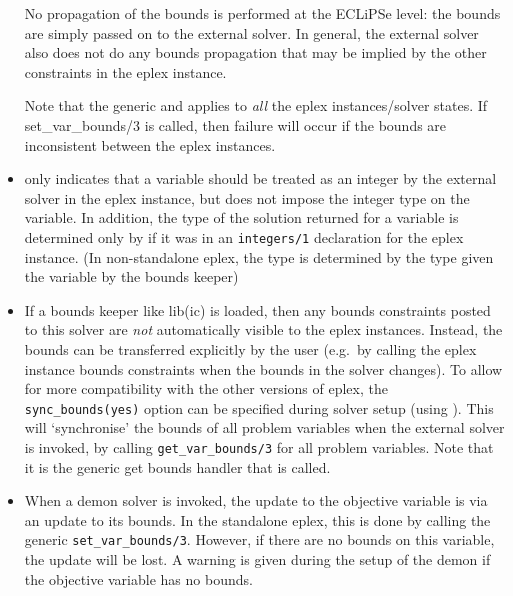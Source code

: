 \begin{sloppypar}
\begin{itemize}
No propagation of the bounds is performed at the ECLiPSe level: the bounds
are simply passed on to the external solver. In general, the external
solver also does not do any bounds propagation that may be implied by the
other constraints in the eplex instance. 

Note that the generic  and 
applies to {\it all} the eplex instances/solver states. If set_var_bounds/3
is called, then failure will occur if the bounds are inconsistent between
the eplex instances.


\item {} 
only indicates that a
variable should be treated as an integer by the external solver in the
eplex instance, but does not impose the integer type on the variable. 
In addition, the type of the solution returned for a variable is determined
only by if it was in an {\tt integers/1} declaration for the eplex instance.
(In non-standalone eplex, the type is determined by the type given the
variable by the bounds keeper)

\item If a bounds keeper like lib(ic) is loaded, then any bounds
constraints posted to this solver are {\it not\/} automatically visible to
the eplex instances. Instead, the bounds can be transferred explicitly by
the user (e.g.\ by calling the eplex instance bounds constraints when the
bounds in the solver changes). To allow for more compatibility with the
other versions of eplex, the \verb'sync_bounds(yes)' option can be
specified during solver setup (using ). This will `synchronise' the bounds of all problem
variables when the external solver is invoked, by calling
\verb'get_var_bounds/3' for all problem variables. Note that it is the generic
get bounds handler that is called. 

\item When a demon solver is invoked, the update to the objective 
variable is via an update to its bounds. In the standalone eplex, this is
done by calling the generic \verb'set_var_bounds/3'. However, if there are
no bounds on this variable, the update will be lost. A warning is given
during the setup of the demon if the objective variable has no bounds. 


\end{itemize}
\end{sloppypar}
